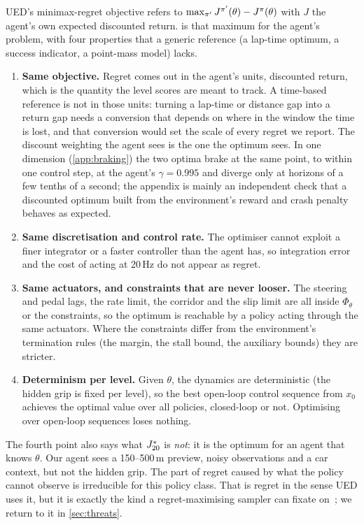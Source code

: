 UED's minimax-regret objective refers to $\max_{\pi'} J^{\pi'}(\theta) - J^{\pi}(\theta)$
with $J$ the agent's own expected discounted return.  is that maximum for
the agent's problem, with four properties that a generic reference (a lap-time optimum,
a success indicator, a point-mass model) lacks.
\begin{enumerate}
  \item \textbf{Same objective.} Regret comes out in the agent's units, discounted
        return, which is the quantity the level scores are meant to track. A time-based
        reference is not in those units: turning a lap-time or distance gap into a return
        gap needs a conversion that depends on where in the window the time is lost, and
        that conversion would set the scale of every regret we report. The discount
        weighting the agent sees is the one the optimum sees. In one dimension
        (\cref{app:braking}) the two optima brake at the same point, to within one control
        step, at the agent's $\gamma = 0.995$ and diverge only at horizons of a few tenths
        of a second; the appendix is mainly an independent check that a discounted optimum
        built from the environment's reward and crash penalty behaves as expected.
  \item \textbf{Same discretisation and control rate.} The optimiser cannot exploit a finer
        integrator or a faster controller than the agent has, so integration error and
        the cost of acting at 20\,Hz do not appear as regret.
  \item \textbf{Same actuators, and constraints that are never looser.} The steering and
        pedal lags, the rate limit, the corridor and the slip limit are all inside
        $\Phi_\theta$ or the constraints, so the optimum is reachable by a policy acting
        through the same actuators. Where the constraints differ from the environment's
        termination rules (the margin, the stall bound, the auxiliary bounds) they are
        stricter.
  \item \textbf{Determinism per level.} Given $\theta$, the dynamics are deterministic
        (the hidden grip is fixed per level), so the best open-loop control sequence from
        $x_0$ achieves the optimal value over all policies, closed-loop or not. Optimising
        over open-loop sequences loses nothing.
\end{enumerate}
The fourth point also says what $J^{*}_{20}$ is \emph{not}: it is the optimum for an agent that
knows $\theta$. Our agent sees a 150--500\,m preview, noisy observations and a car
context, but not the hidden grip. The part of regret caused by what the policy cannot
observe is irreducible for this policy class. That is regret in the sense UED uses it,
but it is exactly the kind a regret-maximising sampler can fixate
on~\citep{beukman2024remidi}; we return to it in \cref{sec:threats}.

